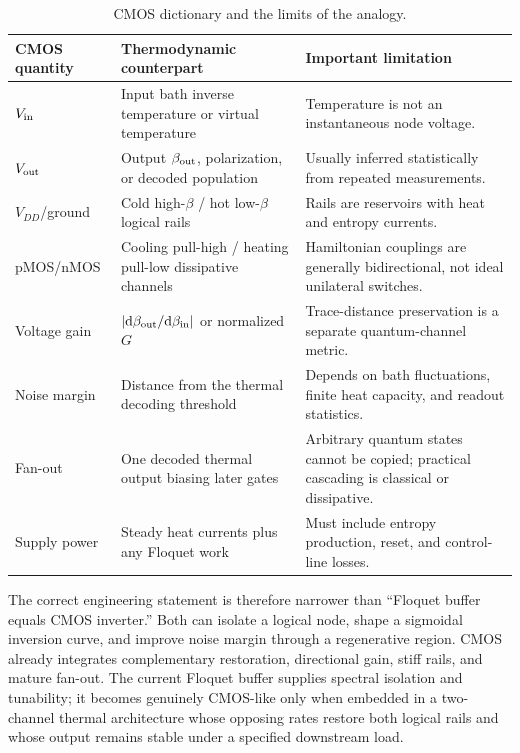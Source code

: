 \documentclass[11pt,a4paper]{article}
\theoremstyle{plain}
\theoremstyle{definition}
\theoremstyle{remark}
\begin{document}
\begin{table}[H]\centering\small
\caption{CMOS dictionary and the limits of the analogy.}
\label{tab:cmos-thermal-dictionary}
\begin{tabularx}{\textwidth}{@{}l X X@{}}
\toprule
CMOS quantity & Thermodynamic counterpart & Important limitation \\
\midrule
$V_{\rm in}$ & Input bath inverse temperature or virtual temperature & Temperature is not an instantaneous node voltage. \\
$V_{\rm out}$ & Output $\beta_{\rm out}$, polarization, or decoded population & Usually inferred statistically from repeated measurements. \\
$V_{DD}$/ground & Cold high-$\beta$ / hot low-$\beta$ logical rails & Rails are reservoirs with heat and entropy currents. \\
pMOS/nMOS & Cooling pull-high / heating pull-low dissipative channels & Hamiltonian couplings are generally bidirectional, not ideal unilateral switches. \\
Voltage gain & $|\mathrm{d}\beta_{\rm out}/\mathrm{d}\beta_{\rm in}|$ or normalized $G$ & Trace-distance preservation is a separate quantum-channel metric. \\
Noise margin & Distance from the thermal decoding threshold & Depends on bath fluctuations, finite heat capacity, and readout statistics. \\
Fan-out & One decoded thermal output biasing later gates & Arbitrary quantum states cannot be copied; practical cascading is classical or dissipative. \\
Supply power & Steady heat currents plus any Floquet work & Must include entropy production, reset, and control-line losses. \\
\bottomrule
\end{tabularx}
\end{table}

The correct engineering statement is therefore narrower than
``Floquet buffer equals CMOS inverter.''  Both can isolate a logical node,
shape a sigmoidal inversion curve, and improve noise margin through a
regenerative region.  CMOS already integrates complementary restoration,
directional gain, stiff rails, and mature fan-out.  The current Floquet
buffer supplies spectral isolation and tunability; it becomes genuinely
CMOS-like only when embedded in a two-channel thermal architecture whose
opposing rates restore both logical rails and whose output remains stable
under a specified downstream load.
\end{document}
